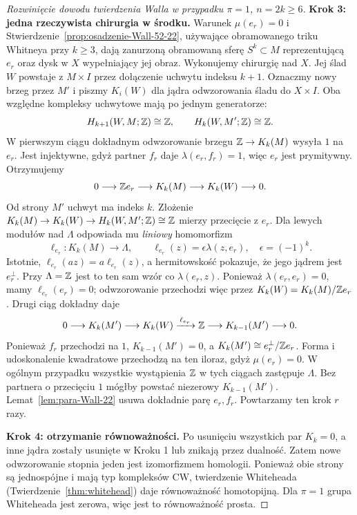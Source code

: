 \begin{proof}[Rozwinięcie dowodu twierdzenia Walla w przypadku
 $\pi=1$, $n=2k\geq6$]
\textbf{Krok 3: jedna rzeczywista chirurgia
w środku.}
Warunek $\mu(e_r)=0$ i
Stwierdzenie~\ref{prop:osadzenie-Wall-52-22},
używające obramowanego triku Whitneya
przy $k\geq3$, dają zanurzoną obramowaną
sferę $S^k\subset M$ reprezentującą $e_r$
oraz dysk w $X$ wypełniający jej obraz.
Wykonujemy chirurgię nad $X$.
Jej ślad $W$ powstaje z $M\times I$
przez dołączenie uchwytu indeksu $k+1$.
Oznaczmy nowy brzeg przez $M'$ i piszmy
$K_i(W)$ dla jądra odwzorowania śladu do $X\times I$.
Oba względne kompleksy uchwytowe mają po
jednym generatorze:
\[
 H_{k+1}(W,M;\mathbb{Z})\cong\mathbb{Z},\qquad
 H_k(W,M';\mathbb{Z})\cong\mathbb{Z}.
\]
W pierwszym ciągu dokładnym odwzorowanie brzegu
$\mathbb{Z}\to K_k(M)$ wysyła $1$ na $e_r$.
Jest injektywne, gdyż partner $f_r$ daje
$\lambda(e_r,f_r)=1$, więc $e_r$ jest
prymitywny. Otrzymujemy
\[
 0\longrightarrow\mathbb{Z} e_r\longrightarrow K_k(M)
 \longrightarrow K_k(W)\longrightarrow0.
\]
Od strony $M'$ uchwyt ma indeks $k$.
Złożenie $K_k(M)\to K_k(W)\to
H_k(W,M';\mathbb{Z})\cong\mathbb{Z}$ mierzy przecięcie
z $e_r$. Dla lewych modułów nad
$\Lambda$ odpowiada mu \emph{liniowy}
homomorfizm
\[
 \ell_{e_r}:K_k(M)\longrightarrow\Lambda,
 \qquad \ell_{e_r}(z)=\epsilon\lambda(z,e_r),
 \quad \epsilon=(-1)^k.
\]
Istotnie, $\ell_{e_r}(az)=a\ell_{e_r}(z)$,
a hermitowskość pokazuje, że jego jądrem
jest $e_r^\perp$. Przy $\Lambda=\mathbb{Z}$ jest to
ten sam wzór co $\lambda(e_r,z)$.
Ponieważ $\lambda(e_r,e_r)=0$, mamy
$\ell_{e_r}(e_r)=0$; odwzorowanie przechodzi więc
przez $K_k(W)=K_k(M)/\mathbb{Z} e_r$.
Drugi ciąg dokładny daje
\[
 0\longrightarrow K_k(M')\longrightarrow K_k(W)
 \xrightarrow{\,\ell_{e_r}\,}\mathbb{Z}
 \longrightarrow K_{k-1}(M')\longrightarrow0.
\]
Ponieważ $f_r$ przechodzi na $1$,
$K_{k-1}(M')=0$, a
$K_k(M')\cong e_r^\perp/\mathbb{Z} e_r$.
Forma i udoskonalenie kwadratowe przechodzą
na ten iloraz, gdyż $\mu(e_r)=0$.
W ogólnym przypadku wszystkie wystąpienia
$\mathbb{Z}$ w tych ciągach zastępuje $\Lambda$.
Bez partnera o przecięciu $1$ mógłby
powstać niezerowy $K_{k-1}(M')$.
Lemat~\ref{lem:para-Wall-22} usuwa dokładnie
parę $e_r,f_r$. Powtarzamy ten krok $r$ razy.

\textbf{Krok 4: otrzymanie równoważności.}
Po usunięciu wszystkich par $K_k=0$,
a inne jądra zostały usunięte w Kroku 1
lub znikają przez dualność. Zatem nowe
odwzorowanie stopnia jeden jest izomorfizmem
homologii. Ponieważ obie strony są
jednospójne i mają typ kompleksów CW,
twierdzenie Whiteheada
(Twierdzenie~\ref{thm:whitehead})
daje równoważność homotopijną.
Dla $\pi=1$ grupa Whiteheada jest zerowa,
więc jest to równoważność prosta.


\end{proof}
